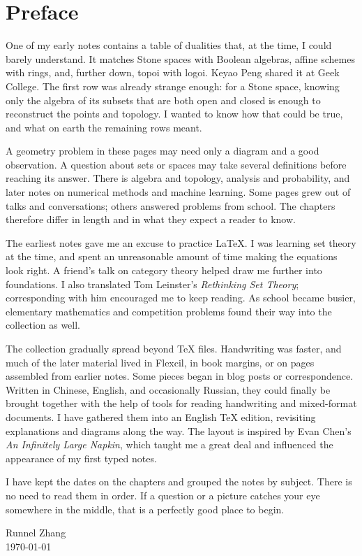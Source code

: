 \chapter*{Preface}

One of my early notes contains a table of dualities that, at the time, I could barely understand. It matches Stone spaces with Boolean algebras, affine schemes with rings, and, further down, topoi with logoi. Keyao Peng shared it at Geek College. The first row was already strange enough: for a Stone space, knowing only the algebra of its subsets that are both open and closed is enough to reconstruct the points and topology. I wanted to know how that could be true, and what on earth the remaining rows meant.

A geometry problem in these pages may need only a diagram and a good observation. A question about sets or spaces may take several definitions before reaching its answer. There is algebra and topology, analysis and probability, and later notes on numerical methods and machine learning. Some pages grew out of talks and conversations; others answered problems from school. The chapters therefore differ in length and in what they expect a reader to know.

The earliest notes gave me an excuse to practice \LaTeX. I was learning set theory at the time, and spent an unreasonable amount of time making the equations look right. A friend's talk on category theory helped draw me further into foundations. I also translated Tom Leinster's \emph{Rethinking Set Theory}; corresponding with him encouraged me to keep reading. As school became busier, elementary mathematics and competition problems found their way into the collection as well.

The collection gradually spread beyond TeX files. Handwriting was faster, and much of the later material lived in Flexcil, in book margins, or on pages assembled from earlier notes. Some pieces began in blog posts or correspondence. Written in Chinese, English, and occasionally Russian, they could finally be brought together with the help of tools for reading handwriting and mixed-format documents. I have gathered them into an English TeX edition, revisiting explanations and diagrams along the way. The layout is inspired by Evan Chen's \emph{An Infinitely Large Napkin}, which taught me a great deal and influenced the appearance of my first typed notes.

I have kept the dates on the chapters and grouped the notes by subject. There is no need to read them in order. If a question or a picture catches your eye somewhere in the middle, that is a perfectly good place to begin.

\begin{flushright}
Runnel Zhang\\
\today
\end{flushright}
